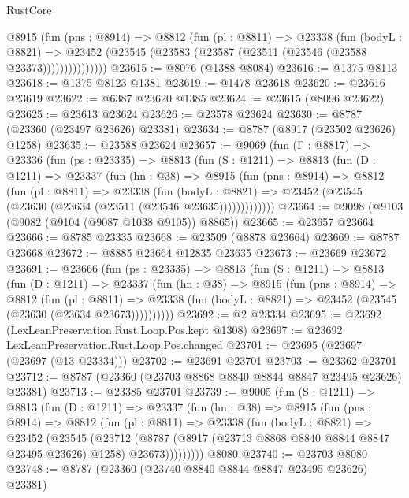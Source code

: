 \begin{lexlean}{RustCore}
\begin{coremodule}
              @8915
                (fun (pns : @8914) =>
                @8812
                  (fun (pl : @8811) =>
                  @23338
                    (fun (bodyL : @8821) =>
                    @23452 (@23545 (@23583 (@23587 (@23511 (@23546 (@23588 @23373)))))))))))))))
@23615 := @8076 (@1388 @8084)
@23616 := @1375 @8113
@23618 := @1375 @8123 @1381
@23619 := @1478 @23618
@23620 := @23616 @23619
@23622 := @6387 @23620 @1385
@23624 := @23615 (@8096 @23622)
@23625 := @23613 @23624
@23626 := @23578 @23624
@23630 := @8787 (@23360 (@23497 @23626) @23381)
@23634 := @8787 (@8917 (@23502 @23626) @1258)
@23635 := @23588 @23624
@23657 := @9069
    (fun (Γ : @8817) =>
    @23336
      (fun (ps : @23335) =>
      @8813
        (fun (S : @1211) =>
        @8813
          (fun (D : @1211) =>
          @23337
            (fun (hn : @38) =>
            @8915
              (fun (pns : @8914) =>
              @8812
                (fun (pl : @8811) =>
                @23338
                  (fun (bodyL : @8821) =>
                  @23452 (@23545 (@23630 (@23634 (@23511 (@23546 @23635)))))))))))))
@23664 := @9098 (@9103 (@9082 (@9104 (@9087 @1038 @9105)) @8865))
@23665 := @23657 @23664
@23666 := @8785 @23335
@23668 := @23509 (@8878 @23664)
@23669 := @8787 @23668
@23672 := @8885 @23664 @12835 @23635
@23673 := @23669 @23672
@23691 := @23666
    (fun (ps : @23335) =>
    @8813
      (fun (S : @1211) =>
      @8813
        (fun (D : @1211) =>
        @23337
          (fun (hn : @38) =>
          @8915
            (fun (pns : @8914) =>
            @8812
              (fun (pl : @8811) =>
              @23338 (fun (bodyL : @8821) => @23452 (@23545 (@23630 (@23634 @23673))))))))))
@23692 := @2 @23334
@23695 := @23692 (LexLeanPreservation.Rust.Loop.Pos.kept @1308)
@23697 := @23692 LexLeanPreservation.Rust.Loop.Pos.changed
@23701 := @23695 (@23697 (@23697 (@13 @23334)))
@23702 := @23691 @23701
@23703 := @23362 @23701
@23712 := @8787 (@23360 (@23703 @8868 @8840 @8844 @8847 @23495 @23626) @23381)
@23713 := @23385 @23701
@23739 := @9005
    (fun (S : @1211) =>
    @8813
      (fun (D : @1211) =>
      @23337
        (fun (hn : @38) =>
        @8915
          (fun (pns : @8914) =>
          @8812
            (fun (pl : @8811) =>
            @23338
              (fun (bodyL : @8821) =>
              @23452
                (@23545
                  (@23712
                    (@8787
                      (@8917 (@23713 @8868 @8840 @8844 @8847 @23495 @23626) @1258)
                      @23673)))))))))
    @8080
@23740 := @23703 @8080
@23748 := @8787 (@23360 (@23740 @8840 @8844 @8847 @23495 @23626) @23381)

\end{coremodule}
\end{lexlean}
